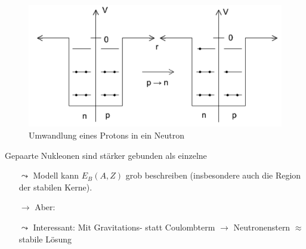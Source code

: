 \begin{figure}[!ht]
\centering
\includegraphics[width=.5\textwidth]{imgs/ep5-fig-4-7.pdf}
\caption{Umwandlung eines Protons in ein Neutron \label{fig:4.7}}
\end{figure}

Gepaarte Nukleonen sind stärker gebunden als \glqq einzelne\grqq{}
\begin{itemize}
\item[$\leadsto$] Modell kann $E_B(A,Z)$ grob beschreiben (insbesondere auch die Region der stabilen Kerne).
\item[$\rightarrow$] Aber:
\item[$\leadsto$] Interessant: Mit Gravitations- statt Coulombterm $\rightarrow$ Neutronenstern $\approx$ stabile Lösung
\end{itemize}

